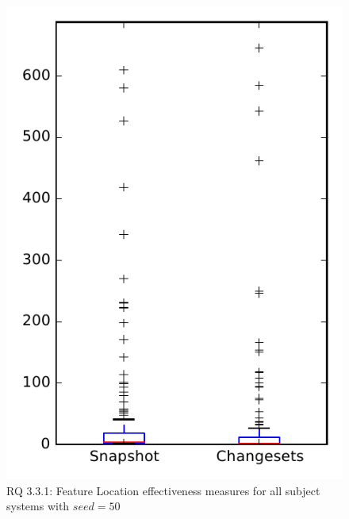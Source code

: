 
\begin{figure}
\centering
\includegraphics[height=0.4\textheight]{figures/flt_seed/rq1_overview_50}
\caption{RQ 3.3.1: Feature Location effectiveness measures for all subject systems with $seed=50$}
\label{fig:flt_seed:rq1:overview}
\end{figure}
